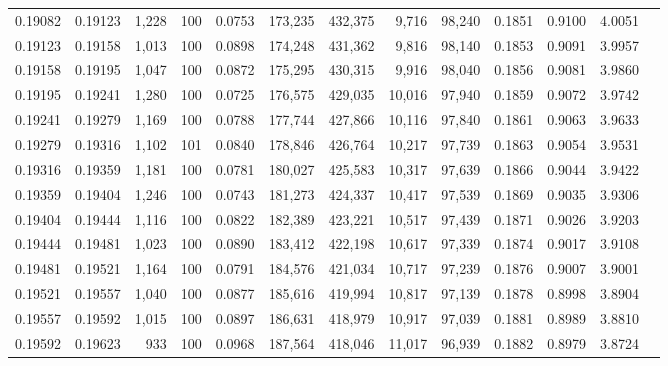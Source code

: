 \begin{tabular}{rrrrrrrrrrrrr}
0.19082 & 0.19123 & 1,228 & 100 &                                     0.0753 & 173,235 & 432,375 &   9,716 &  98,240 & 0.1851 & 0.9100 & 4.0051 \\
0.19123 & 0.19158 & 1,013 & 100 &                                     0.0898 & 174,248 & 431,362 &   9,816 &  98,140 & 0.1853 & 0.9091 & 3.9957 \\
0.19158 & 0.19195 & 1,047 & 100 &                                     0.0872 & 175,295 & 430,315 &   9,916 &  98,040 & 0.1856 & 0.9081 & 3.9860 \\
0.19195 & 0.19241 & 1,280 & 100 &                                     0.0725 & 176,575 & 429,035 &  10,016 &  97,940 & 0.1859 & 0.9072 & 3.9742 \\
0.19241 & 0.19279 & 1,169 & 100 &                                     0.0788 & 177,744 & 427,866 &  10,116 &  97,840 & 0.1861 & 0.9063 & 3.9633 \\
0.19279 & 0.19316 & 1,102 & 101 &                                     0.0840 & 178,846 & 426,764 &  10,217 &  97,739 & 0.1863 & 0.9054 & 3.9531 \\
0.19316 & 0.19359 & 1,181 & 100 &                                     0.0781 & 180,027 & 425,583 &  10,317 &  97,639 & 0.1866 & 0.9044 & 3.9422 \\
0.19359 & 0.19404 & 1,246 & 100 &                                     0.0743 & 181,273 & 424,337 &  10,417 &  97,539 & 0.1869 & 0.9035 & 3.9306 \\
0.19404 & 0.19444 & 1,116 & 100 &                                     0.0822 & 182,389 & 423,221 &  10,517 &  97,439 & 0.1871 & 0.9026 & 3.9203 \\
0.19444 & 0.19481 & 1,023 & 100 &                                     0.0890 & 183,412 & 422,198 &  10,617 &  97,339 & 0.1874 & 0.9017 & 3.9108 \\
0.19481 & 0.19521 & 1,164 & 100 &                                     0.0791 & 184,576 & 421,034 &  10,717 &  97,239 & 0.1876 & 0.9007 & 3.9001 \\
0.19521 & 0.19557 & 1,040 & 100 &                                     0.0877 & 185,616 & 419,994 &  10,817 &  97,139 & 0.1878 & 0.8998 & 3.8904 \\
0.19557 & 0.19592 & 1,015 & 100 &                                     0.0897 & 186,631 & 418,979 &  10,917 &  97,039 & 0.1881 & 0.8989 & 3.8810 \\
0.19592 & 0.19623 &   933 & 100 &                                     0.0968 & 187,564 & 418,046 &  11,017 &  96,939 & 0.1882 & 0.8979 & 3.8724 \\

\end{tabular}
